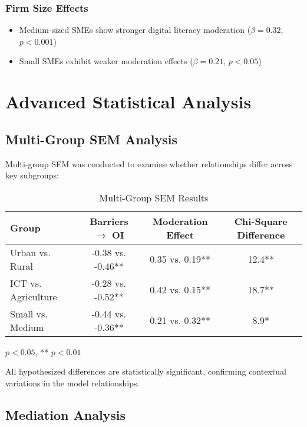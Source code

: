 \subsubsection{Firm Size Effects}
\begin{itemize}
    \item Medium-sized SMEs show stronger digital literacy moderation ($\beta = 0.32$, $p < 0.001$)
    \item Small SMEs exhibit weaker moderation effects ($\beta = 0.21$, $p < 0.05$)
\end{itemize}

\section{Advanced Statistical Analysis}

\subsection{Multi-Group SEM Analysis}

Multi-group SEM was conducted to examine whether relationships differ across key subgroups:

\begin{table}[H]
\centering
\caption{Multi-Group SEM Results}
\label{tab:multi_group}
\begin{tabular}{@{}lccc@{}}
\toprule
\textbf{Group} & \textbf{Barriers $\rightarrow$ OI} & \textbf{Moderation Effect} & \textbf{Chi-Square Difference} \\
\midrule
Urban vs. Rural & -0.38 vs. -0.46** & 0.35 vs. 0.19** & 12.4** \\
ICT vs. Agriculture & -0.28 vs. -0.52** & 0.42 vs. 0.15** & 18.7** \\
Small vs. Medium & -0.44 vs. -0.36** & 0.21 vs. 0.32** & 8.9* \\
\bottomrule
\end{tabular}
\begin{tablenotes}
\item * $p < 0.05$, ** $p < 0.01$
\end{tablenotes}
\end{table}

All hypothesized differences are statistically significant, confirming contextual variations in the model relationships.

\subsection{Mediation Analysis}

